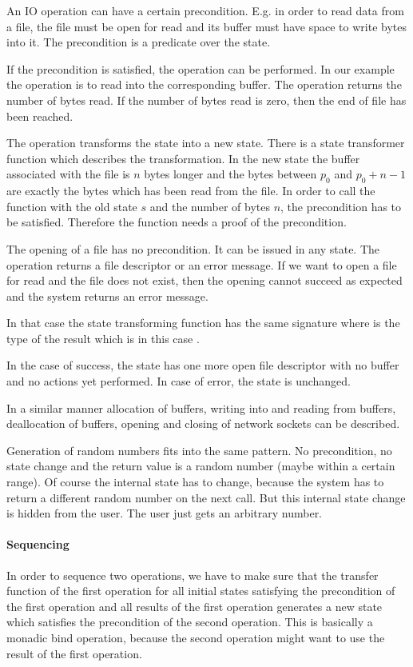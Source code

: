 An IO operation can have a certain precondition. E.g. in order to read data from
a file, the file must be open for read and its buffer must have space to write
bytes into it. The precondition is a predicate over the state.

If the precondition is satisfied, the operation can be performed. In our example
the operation is to read into the corresponding buffer. The operation returns
the number of bytes read. If the number of bytes read is zero, then the end of
file has been reached.

The operation transforms the state into a new state. There is a state
transformer function  which
describes the transformation. In the new state the buffer associated with the
file is $n$ bytes longer and the bytes between $p_0$ and $p_0 + n - 1$ are
exactly the bytes which has been read from the file. In order to call the
function with the old state $s$ and the number of bytes $n$, the precondition
has to be satisfied. Therefore the function needs a proof of the precondition.


The opening of a file has no precondition. It can be issued in any state. The
operation returns a file descriptor or an error message. If we want to open a
file for read and the file does not exist, then the opening cannot succeed as
expected and the system returns an error message.

In that case the state transforming function has the same signature  where  is the type of the result which
is in this case .

In the case of success, the state has one more open file descriptor with no
buffer and no actions yet performed. In case of error, the state is unchanged.

In a similar manner allocation of buffers, writing into and reading from
buffers, deallocation of buffers, opening and closing of network sockets can be
described.

Generation of random numbers fits into the same pattern. No precondition, no
state change and the return value is a random number (maybe within a certain
range). Of course the internal state has to change, because the system has to
return a different random number on the next call. But this internal state
change is hidden from the user. The user just gets an arbitrary number.


\paragraph{Sequencing} In order to sequence two operations, we have to make sure
that the transfer function of the first operation for all initial
states satisfying the precondition of the first operation and all results of the
first operation generates a new state which satisfies the precondition of the
second operation. This is basically a monadic bind operation, because the
second operation might want to use the result of the first operation.

